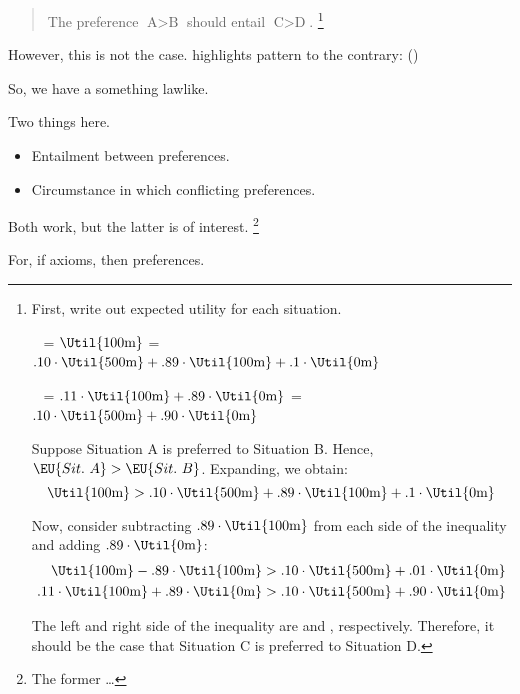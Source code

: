 \begin{note}
  \begin{quote}
    The preference \(\text{A} > \text{B}\) should entail \(\text{C} > \text{D}\).%
    \footnote{
      First, write out expected utility for each situation.

      \smallskip
      \mbox{ }\hfill%
       = \(\Util{100\text{m}}\)%
      \hfill%
       = \(.10 \cdot \Util{500\text{m}} + .89 \cdot \Util{100\text{m}} + .1 \cdot \Util{0\text{m}}\)%
      \hfill\mbox{ }

      \mbox{ }\hfill%
       = \(.11 \cdot \Util{100\text{m}} + .89 \cdot \Util{0\text{m}}\)%
      \hfill%
       = \(.10 \cdot \Util{500\text{m}} + .90 \cdot \Util{0\text{m}}\)%
      \hfill\mbox{ }
      \smallskip

      Suppose Situation A is preferred to Situation B.
      Hence, \(\EU{Sit.\ A} > \EU{Sit.\ B}\).
      Expanding, we obtain:
      \[
        \Util{100\text{m}} > .10 \cdot \Util{500\text{m}} + .89 \cdot \Util{100\text{m}} + .1 \cdot \Util{0\text{m}}
      \]

      Now, consider subtracting \(.89 \cdot \Util{100\text{m}}\) from each side of the inequality and adding \(.89 \cdot \Util{0\text{m}}\):
      \begin{align*}
        \Util{100\text{m}} - .89 \cdot \Util{100\text{m}} &> .10 \cdot \Util{500\text{m}} + .01 \cdot \Util{0\text{m}} \\
         .11 \cdot \Util{100\text{m}} + .89 \cdot \Util{0\text{m}} &> .10 \cdot \Util{500\text{m}} + .90 \cdot \Util{0\text{m}}
      \end{align*}

      The left and right side of the inequality are  and , respectively.
      Therefore, it should be the case that Situation C is preferred to Situation D.
    }
  \end{quote}
  However, this is not the case.
  \citeauthor{Allais:1979aa} highlights pattern to the contrary:
  (\citeyear[89]{Allais:1979aa})

  So, we have a something lawlike.%

  Two things here.
  \begin{itemize}
  \item
    Entailment between preferences.
  \item
    Circumstance in which conflicting preferences.
  \end{itemize}

  Both work, but the latter is of interest.%
  \footnote{
    \color{red}
    The former \dots
  }

  For, if axioms, then preferences.
\end{note}

